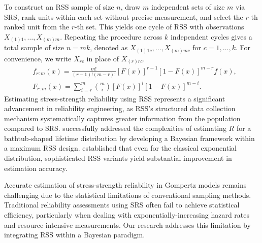 \documentclass[twoside]{article}
\begin{document}
To construct an RSS sample of size $n$, draw $m$ independent sets of size $m$ via SRS, rank units within each set without precise measurement, and select the $r$-th ranked unit from the $r$-th set. This yields one cycle of RSS with observations $X_{(1)1},\ldots,X_{(m)m}$. Repeating the procedure across $k$ independent cycles gives a total sample of size $n=mk$, denoted as $X_{(1)1c},\ldots,X_{(m)mc}$ for $c=1,\ldots,k$. For convenience, we write $X_{rc}$ in place of $X_{(r)rc}$. %
\begin{align}
&f_{r:m}(x)=\frac{m!}{(r-1)!(m-r)!}[F(x)]^{r-1}[1-F(x)]^{m-r}f(x),\\
&F_{r:m}(x)=\sum_{i=r}^{m}\binom{m}{i}[F(x)]^{i}[1-F(x)]^{m-i}.
\end{align}
Estimating stress-strength reliability using RSS represents a significant advancement in reliability engineering, as RSS's structured data collection mechanism systematically captures greater information from the population compared to SRS. \cite{basikhasteh2020bayesian} successfully addressed the complexities of estimating $R$ for a bathtub-shaped lifetime distribution by developing a Bayesian framework within a maximum RSS design. \cite{aldrabseh2025enhanced} established that even for the classical exponential distribution, sophisticated RSS variants yield substantial improvement in estimation accuracy.

Accurate estimation of stress-strength reliability in Gompertz models remains challenging due to the statistical limitations of conventional sampling methods. Traditional reliability assessments using SRS often fail to achieve statistical efficiency, particularly when dealing with exponentially-increasing hazard rates and resource-intensive measurements. Our research addresses this limitation by integrating RSS within a Bayesian paradigm. 
\end{document}
